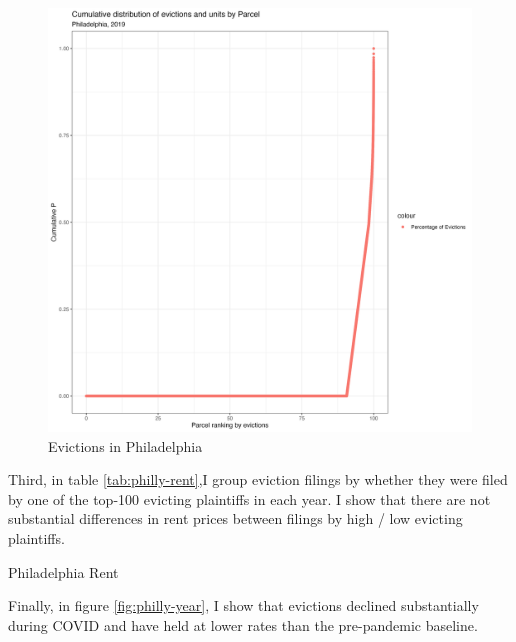 \documentclass{article}
\begin{document}
\begin{figure}[htbp]
    \centering
    \includegraphics[width=1\linewidth]{figs/cumulative_evict_dist_parcels.png}
    \caption{Evictions in Philadelphia}
    \label{fig:philly-evict-parcel}
\end{figure}

Third, in table \ref{tab:philly-rent},I group eviction filings by whether they were filed by one of the top-100 evicting plaintiffs in each year. I show that there are not substantial differences in rent prices between filings by high / low evicting plaintiffs.\\

\begin{table}[htbp]
    
    \caption{Philadelphia Rent}
    \label{tab:philly-rent}
\end{table}


Finally, in figure \ref{fig:philly-year}, I show that evictions declined substantially during COVID and have held at lower rates than the pre-pandemic baseline. \\
\end{document}
